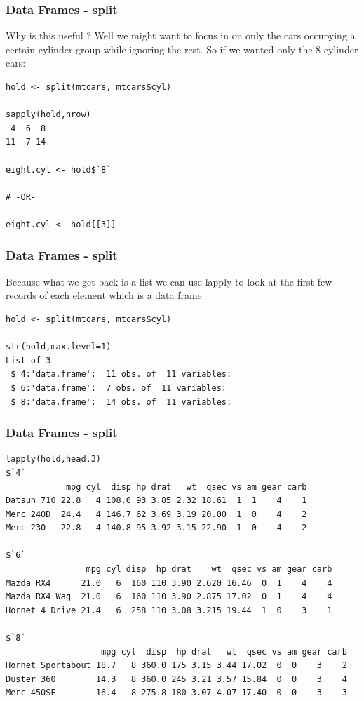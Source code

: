 \documentclass{beamer}
\begin{document}
\begin{frame}[fragile]
\frametitle{Data Frames - split}
Why is this useful ? Well we might want to focus in on only the cars occupying a certain cylinder group while ignoring the rest. So if we wanted only the 8 cylinder cars:
\footnotesize
\begin{verbatim}
hold <- split(mtcars, mtcars$cyl) 

sapply(hold,nrow)
 4  6  8 
11  7 14 

eight.cyl <- hold$`8`   

# -OR-

eight.cyl <- hold[[3]]

\end{verbatim}
\end{frame}
%
\begin{frame}[fragile]
\frametitle{Data Frames - split}
Because what we get back is a list we can use lapply to look at the first few records of each element which is a data frame
\footnotesize
\begin{verbatim}
hold <- split(mtcars, mtcars$cyl) 

str(hold,max.level=1)
List of 3
 $ 4:'data.frame':  11 obs. of  11 variables:
 $ 6:'data.frame':  7 obs. of  11 variables:
 $ 8:'data.frame':	14 obs. of  11 variables:
\end{verbatim}
\end{frame}


\begin{frame}[fragile]
\frametitle{Data Frames - split}
\footnotesize
\begin{verbatim}
lapply(hold,head,3)
$`4`
            mpg cyl  disp hp drat   wt  qsec vs am gear carb
Datsun 710 22.8   4 108.0 93 3.85 2.32 18.61  1  1    4    1
Merc 240D  24.4   4 146.7 62 3.69 3.19 20.00  1  0    4    2
Merc 230   22.8   4 140.8 95 3.92 3.15 22.90  1  0    4    2

$`6`
                mpg cyl disp  hp drat    wt  qsec vs am gear carb
Mazda RX4      21.0   6  160 110 3.90 2.620 16.46  0  1    4    4
Mazda RX4 Wag  21.0   6  160 110 3.90 2.875 17.02  0  1    4    4
Hornet 4 Drive 21.4   6  258 110 3.08 3.215 19.44  1  0    3    1

$`8`
                   mpg cyl  disp  hp drat   wt  qsec vs am gear carb
Hornet Sportabout 18.7   8 360.0 175 3.15 3.44 17.02  0  0    3    2
Duster 360        14.3   8 360.0 245 3.21 3.57 15.84  0  0    3    4
Merc 450SE        16.4   8 275.8 180 3.07 4.07 17.40  0  0    3    3
\end{verbatim}
\end{frame}
\end{document}
